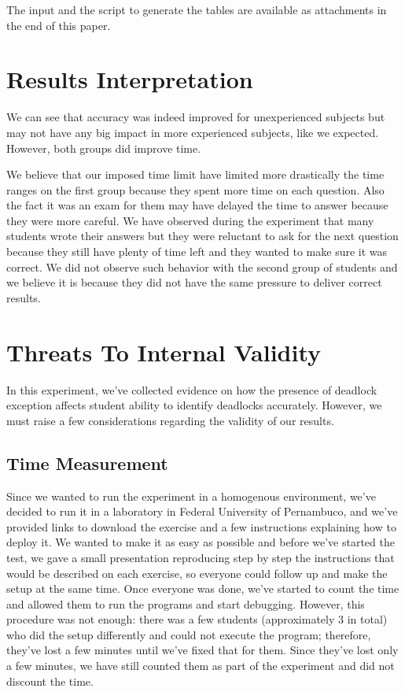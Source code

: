 The input and the script to generate the tables are available as attachments in the end of this paper.


\section{Results Interpretation}


We can see that accuracy was indeed improved for unexperienced subjects but may not have any big impact in more experienced subjects, like we expected. However, both groups did improve time.

We believe that our imposed time limit have limited more drastically the time ranges on the first group because they spent more time on each question. Also the fact it was an exam for them may have delayed the time to answer because they were more careful. We have observed during the experiment that many students wrote their answers but they were reluctant to ask for the next question because they still have plenty of time left and they wanted to make sure it was correct. We did not observe such behavior with the second group of students and we believe it is because they did not have the same pressure to deliver correct results.

\section{Threats To Internal Validity}

In this experiment, we've collected evidence on how the presence of deadlock exception affects student ability to identify deadlocks accurately. However, we must raise a few considerations regarding the validity of our results.

\subsection{Time Measurement}

Since we wanted to run the experiment in a homogenous environment, we've decided to run it in a laboratory in Federal University of Pernambuco, and we've provided links to download the exercise and a few instructions explaining how to deploy it. We wanted to make it as easy as possible and before we've started the test, we gave a small presentation reproducing step by step the instructions that would be described on each exercise, so everyone could follow up and make the setup at the same time. Once everyone was done, we've started to count the time and allowed them to run the programs and start debugging. However, this procedure was not enough: there was a few students (approximately 3 in total) who did the setup differently and could not execute the program; therefore, they've lost a few minutes until we've fixed that for them. Since they've lost only a few minutes, we have still counted them as part of the experiment and did not discount the time.

